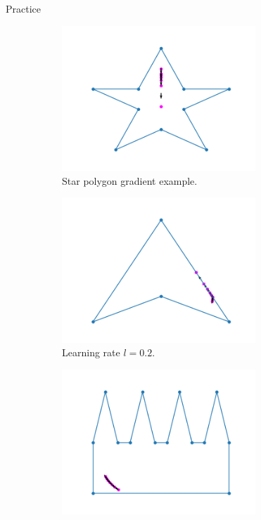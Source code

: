 \documentclass{beamer}
\begin{document}
\begin{frame}{Practice}
	\begin{figure}[h!]
		\centering
		\begin{subfigure}{0.45\textwidth}
			\centering
			\includegraphics[width = 0.8\textwidth]{Images/pentagram_gradient.png}
			\caption{Star polygon gradient example.}
			\label{fig:star_gradient}
		\end{subfigure}
		\begin{subfigure}{0.45\textwidth}
			\centering
			\includegraphics[width = 0.8\textwidth]{Images/concave_triangle_gradient.png}
			\caption{Learning rate $l = 0.2$.}
			\label{fig:concave_gradient}
		\end{subfigure}
		\begin{subfigure}{0.45\textwidth}
			\centering
			\includegraphics[width = 0.8\textwidth]{Images/comb_gradient.png}

\end{subfigure}
\end{figure}
\end{frame}
\end{document}
